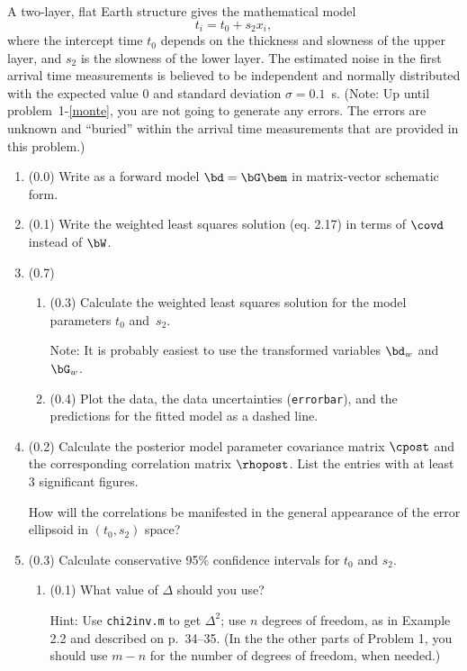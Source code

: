 \documentclass[11pt,titlepage,fleqn]{article}
\begin{document}
A two-layer, flat Earth structure gives the mathematical model
%
\begin{equation}
t_i = t_0 + s_2x_i,
\label{twolayer}
\end{equation}
%
where the intercept time $t_0$ depends on the thickness and slowness of the upper layer, and $s_2$ is the slowness of the lower layer. The estimated noise in the first arrival time measurements is believed to be independent and normally distributed with the expected value 0 and standard deviation $\sigma = 0.1$~s. (Note: Up until problem~1-\ref{monte}, you are not going to generate any errors. The errors are unknown and ``buried'' within the arrival time measurements that are provided in this problem.)
%
\begin{enumerate}
\item (0.0) Write  as a forward model $\bd = \bG\bem$ in matrix-vector schematic form.

\item (0.1) Write the weighted least squares solution (eq. 2.17) in terms of $\covd$ instead of $\bW$.

\item (0.7) 
\begin{enumerate}
\item (0.3) Calculate the weighted least squares solution for the model parameters $t_0$ and~$s_2$.

Note: It is probably easiest to use the transformed variables $\bd_w$ and $\bG_w$.
\item (0.4) Plot the data, the data uncertainties (\verb+errorbar+), and the predictions for the fitted model as a dashed line.
\end{enumerate}


\item (0.2) Calculate the posterior model parameter covariance matrix $\cpost$ and the corresponding correlation matrix $\rhopost$. List the entries with at least 3 significant figures.

How will the correlations be manifested in the general appearance of the error ellipsoid in $(t_0,s_2)$ space?

\pagebreak
\item (0.3) Calculate conservative 95\% confidence intervals for $t_0$ and $s_2$.
%
\begin{enumerate}
\item (0.1) What value of $\Delta$ should you use?

Hint: Use \verb+chi2inv.m+ to get $\Delta^2$; use $n$ degrees of freedom, as in Example 2.2 and described on p.~34--35. (In the the other parts of Problem 1, you should use $m-n$ for the number of degrees of freedom, when needed.)


\end{enumerate}
\end{enumerate}
\end{document}
